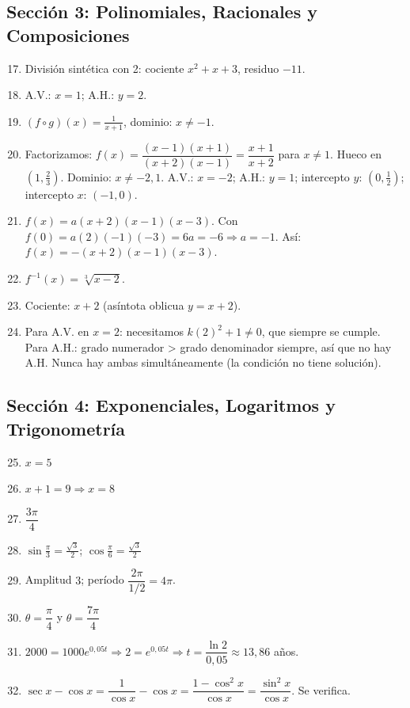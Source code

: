 \documentclass[12pt, a4paper]{article}
\begin{document}
\subsection*{Sección 3: Polinomiales, Racionales y Composiciones}

\begin{enumerate}[leftmargin=*, label=\textbf{\arabic*.}]
  \setcounter{enumi}{16}
  \item División sintética con 2: cociente $x^2 + x + 3$, residuo $-11$.
  \item A.V.: $x = 1$; A.H.: $y = 2$.
  \item $(f \circ g)(x) = \frac{1}{x + 1}$, dominio: $x \neq -1$.
  \item Factorizamos: $f(x) = \dfrac{(x - 1)(x + 1)}{(x + 2)(x - 1)} = \dfrac{x + 1}{x + 2}$ para $x \neq 1$. Hueco en $(1, \frac{2}{3})$. Dominio: $x \neq -2, 1$. A.V.: $x = -2$; A.H.: $y = 1$; intercepto $y$: $(0, \frac{1}{2})$; intercepto $x$: $(-1, 0)$.
  \item $f(x) = a(x + 2)(x - 1)(x - 3)$. Con $f(0) = a(2)(-1)(-3) = 6a = -6 \Rightarrow a = -1$. Así: $f(x) = -(x + 2)(x - 1)(x - 3)$.
  \item $f^{-1}(x) = \sqrt[3]{x - 2}$.
  \item Cociente: $x + 2$ (asíntota oblicua $y = x + 2$).
  \item Para A.V. en $x = 2$: necesitamos $k(2)^2 + 1 \neq 0$, que siempre se cumple. Para A.H.: grado numerador > grado denominador siempre, así que no hay A.H. Nunca hay ambas simultáneamente (la condición no tiene solución).
\end{enumerate}

\subsection*{Sección 4: Exponenciales, Logaritmos y Trigonometría}

\begin{enumerate}[leftmargin=*, label=\textbf{\arabic*.}]
  \setcounter{enumi}{24}
  \item $x = 5$
  \item $x + 1 = 9 \Rightarrow x = 8$
  \item $\dfrac{3\pi}{4}$
  \item $\sin\frac{\pi}{3} = \frac{\sqrt{3}}{2}$; $\cos\frac{\pi}{6} = \frac{\sqrt{3}}{2}$
  \item Amplitud $3$; período $\dfrac{2\pi}{1/2} = 4\pi$.
  \item $\theta = \dfrac{\pi}{4}$ y $\theta = \dfrac{7\pi}{4}$
  \item $2000 = 1000e^{0{,}05t} \Rightarrow 2 = e^{0{,}05t} \Rightarrow t = \dfrac{\ln 2}{0{,}05} \approx 13{,}86$ años.
  \item $\sec x - \cos x = \dfrac{1}{\cos x} - \cos x = \dfrac{1 - \cos^2 x}{\cos x} = \dfrac{\sin^2 x}{\cos x}$. Se verifica.
\end{enumerate}
\end{document}

